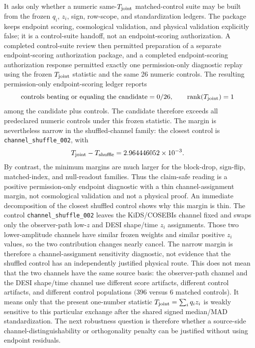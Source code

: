 It asks only whether a numeric same-\(T_{\rm joint}\) matched-control suite may
be built from the frozen \(q_i\), \(z_i\), sign, row-scope, and standardization
ledgers.  The package keeps endpoint scoring, cosmological validation, and
physical validation explicitly false; it is a control-suite handoff, not an
endpoint-scoring authorization.
A completed control-suite review then permitted preparation of a separate
endpoint-scoring authorization package, and a completed endpoint-scoring
authorization response permitted exactly one permission-only diagnostic replay
using the frozen \(T_{\rm joint}\) statistic and the same 26 numeric controls.
The resulting permission-only endpoint-scoring ledger reports
\[
  \text{controls beating or equaling the candidate}=0/26,
  \qquad
  \operatorname{rank}(T_{\rm joint})=1
\]
among the candidate plus controls.  The candidate therefore exceeds all
predeclared numeric controls under this frozen statistic.  The margin is
nevertheless narrow in the shuffled-channel family: the closest control is
\texttt{channel\_shuffle\_002}, with
\[
  T_{\rm joint}-T_{\rm shuffle}=2.964446052\times 10^{-3}.
\]
By contrast, the minimum margins are much larger for the block-drop,
sign-flip, matched-index, and null-readout families.  Thus the claim-safe
reading is a positive permission-only endpoint diagnostic with a thin
channel-assignment margin, not cosmological validation and not a physical
proof.
An immediate decomposition of the closest shuffled control shows why this
margin is thin.  The control \texttt{channel\_shuffle\_002} leaves the
KiDS/COSEBIs channel fixed and swaps only the observer-path low-\(z\) and
DESI shape/time \(z_i\) assignments.  Those two lower-amplitude channels have
similar frozen weights and similar positive \(z_i\) values, so the two
contribution changes nearly cancel.  The narrow margin is therefore a
channel-assignment sensitivity diagnostic, not evidence that the shuffled
control has an independently justified physical route.
This does not mean that the two channels have the same source basis: the
observer-path channel and the DESI shape/time channel use different score
artifacts, different control artifacts, and different control populations
\((396\) versus \(6\) matched controls).  It means only that the present
one-number statistic \(T_{\rm joint}=\sum_i q_i z_i\) is weakly sensitive to
this particular exchange after the shared signed median/MAD standardization.
The next robustness question is therefore whether a source-side
channel-distinguishability or orthogonality penalty can be justified without
using endpoint residuals.
